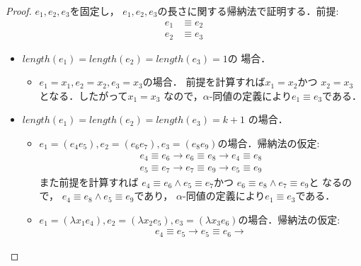 \documentclass{ltjsbook}%
\begin{document}
\begin{proof}%
  $\mathit{e}_1,\mathit{e}_2,\mathit{e}_3$を固定し，%
  $\mathit{e}_1,\mathit{e}_2,\mathit{e}_3$の長さに関する帰納法で証明する．前提:%
  \begin{align}%
    \mathit{e}_1&\equiv \mathit{e}_2\\%
    \mathit{e}_2&\equiv \mathit{e}_3%
  \end{align}%
  \begin{itemize}%
  \item $length(\mathit{e}_1)=length(\mathit{e}_2)=length(\mathit{e}_3)=1$の%
    場合．%
  \begin{itemize}%
  \item $\mathit{e}_1=\mathit{x}_1,\mathit{e}_2=\mathit{x}_2,%
    \mathit{e}_3=\mathit{x}_3$の場合．%
    前提を計算すれば$\mathit{x}_1=\mathit{x}_2$かつ%
    $\mathit{x}_2=\mathit{x}_3$となる．したがって$\mathit{x}_1=\mathit{x}_3$%
    なので，$\alpha$-同値の定義により$\mathit{e}_1\equiv \mathit{e}_3$である．%
  \end{itemize}%
  \item $length(\mathit{e}_1)=length(\mathit{e}_2)=length(\mathit{e}_3)=k+1$%
  の場合．%
  \begin{itemize}%
  \item $\mathit{e}_1=(\mathit{e}_4\mathit{e}_5),%
    \mathit{e}_2=(\mathit{e}_6\mathit{e}_7),%
    \mathit{e}_3=(\mathit{e}_8\mathit{e}_9)$の場合．帰納法の仮定:%
    \begin{align}%
    \mathit{e}_4\equiv\mathit{e}_6\rightarrow%
    \mathit{e}_6\equiv\mathit{e}_8\rightarrow%
    \mathit{e}_4\equiv\mathit{e}_8\\%
    \mathit{e}_5\equiv\mathit{e}_7\rightarrow%
    \mathit{e}_7\equiv\mathit{e}_9\rightarrow%
    \mathit{e}_5\equiv\mathit{e}_9%
    \end{align}%
    また前提を計算すれば%
    $\mathit{e}_4\equiv\mathit{e}_6\land\mathit{e}_5\equiv\mathit{e}_7$かつ%
    $\mathit{e}_6\equiv\mathit{e}_8\land\mathit{e}_7\equiv\mathit{e}_9$と%
    なるので，%
    $\mathit{e}_4\equiv\mathit{e}_8\land\mathit{e}_5\equiv\mathit{e}_9$であり，%
    $\alpha$-同値の定義により$\mathit{e}_1\equiv \mathit{e}_3$である．%
  \item $\mathit{e}_1=(\lambda \mathit{x}_1\mathit{e}_4),%
    \mathit{e}_2=(\lambda \mathit{x}_2\mathit{e}_5),%
    \mathit{e}_3=(\lambda \mathit{x}_3\mathit{e}_6)$の場合．帰納法の仮定:%
    \begin{align}%
    \mathit{e}_4\equiv\mathit{e}_5\rightarrow%
    \mathit{e}_5\equiv\mathit{e}_6\rightarrow%

\end{align}
\end{itemize}
\end{itemize}
\end{proof}
\end{document}
